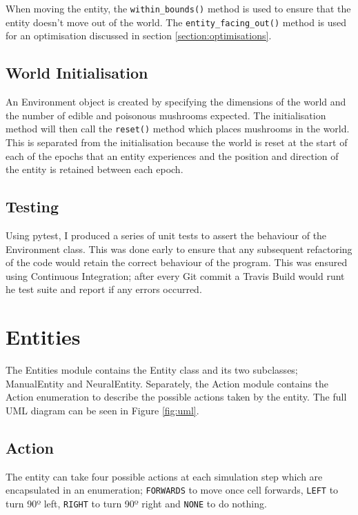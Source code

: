 \documentclass[12pt,a4paper,twoside,openright]{report}
\begin{document}
When moving the entity, the \texttt{within\_bounds()} method is used to ensure that the entity doesn't move out of the world. The \texttt{entity\_facing\_out()} method is used for an optimisation discussed in section \ref{section:optimisations}.

\subsection{World Initialisation}

An Environment object is created by specifying the dimensions of the world and the number of edible and poisonous mushrooms expected. The initialisation method will then call the \texttt{reset()} method which places mushrooms in the world. This is separated from the initialisation because the world is reset at the start of each of the epochs that an entity experiences and the position and direction of the entity is retained between each epoch.

\subsection{Testing}

Using pytest, I produced a series of unit tests to assert the behaviour of the Environment class. This was done early to ensure that any subsequent refactoring of the code would retain the correct behaviour of the program. This was ensured using Continuous Integration; after every Git commit a Travis Build would runt he test suite and report if any errors occurred.

\section{Entities}

The Entities module contains the Entity class and its two subclasses; ManualEntity and NeuralEntity. Separately, the Action module contains the Action enumeration to describe the possible actions taken by the entity. The full UML diagram can be seen in Figure \ref{fig:uml}.

\subsection{Action}

The entity can take four possible actions at each simulation step which are encapsulated in an enumeration; \texttt{FORWARDS} to move once cell forwards, \texttt{LEFT} to turn 90º left, \texttt{RIGHT} to turn 90º right and \texttt{NONE} to do nothing.
\end{document}
